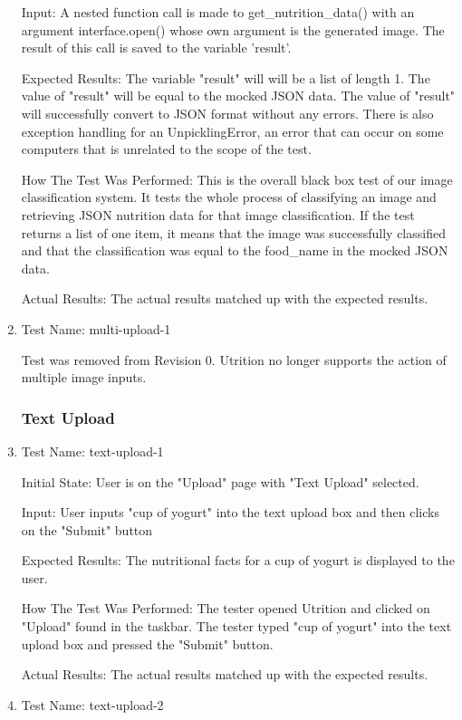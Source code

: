 \documentclass[12pt, titlepage]{article}
\begin{document}
\begin{enumerate}
		Input: A nested function call is made to get\_nutrition\_data() with an argument interface.open() whose own argument is the generated image. The result of this call is saved to the variable 'result'.
		
		Expected Results: The variable "result" will will be a list of length 1. The value of "result" will be equal to the mocked JSON data. The value of "result" will successfully convert to JSON format without any errors. There is also exception handling for an UnpicklingError, an error that can occur on some computers that is unrelated to the scope of the test.
		
		How The Test Was Performed: This is the overall black box test of our image classification system. It tests the whole process of classifying an image and retrieving JSON nutrition data for that image classification. If the test returns a list of one item, it means that the image was successfully classified and that the classification was equal to the food\_name in the mocked JSON data.
		
		Actual Results: The actual results matched up with the expected results.
		
		\item{Test Name: multi-upload-1}
		
		Test was removed from Revision 0. Utrition no longer supports the action of multiple image inputs.
		
		\subsubsection{Text Upload}
		
		\item{Test Name: text-upload-1}
		
		Initial State: User is on the "Upload" page with "Text Upload" selected.
		
		Input: User inputs "cup of yogurt" into the text upload box and then clicks on the "Submit" button
		
		Expected Results: The nutritional facts for a cup of yogurt is displayed to the user.
		
		How The Test Was Performed: The tester opened Utrition and clicked on "Upload" found in the taskbar. The tester typed "cup of yogurt" into the text upload box and pressed the "Submit" button.
		
		Actual Results: The actual results matched up with the expected results.
		
		\item{Test Name: text-upload-2}
		

\end{enumerate}
\end{document}
